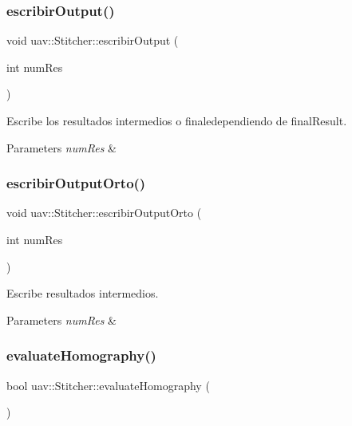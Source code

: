 \subsubsection{\texorpdfstring{escribir\+Output()}{escribirOutput()}}
{\footnotesize\ttfamily void uav\+::\+Stitcher\+::escribir\+Output (\begin{DoxyParamCaption}\item[{int}]{num\+Res }\end{DoxyParamCaption})\hspace{0.3cm}{\ttfamily [inline]}}



Escribe los resultados intermedios o finaledependiendo de final\+Result. 


\begin{DoxyParams}{Parameters}
{\em num\+Res} & \\
\hline
\end{DoxyParams}
\mbox{\label{classuav_1_1Stitcher_aa3ed2d63f08d787b3b78ec4445195b2b}} 
\subsubsection{\texorpdfstring{escribir\+Output\+Orto()}{escribirOutputOrto()}}
{\footnotesize\ttfamily void uav\+::\+Stitcher\+::escribir\+Output\+Orto (\begin{DoxyParamCaption}\item[{int}]{num\+Res }\end{DoxyParamCaption})\hspace{0.3cm}{\ttfamily [inline]}}



Escribe resultados intermedios. 


\begin{DoxyParams}{Parameters}
{\em num\+Res} & \\
\hline
\end{DoxyParams}
\mbox{\label{classuav_1_1Stitcher_a90039daf32275b9b9a4d7820e7a6a929}} 
\subsubsection{\texorpdfstring{evaluate\+Homography()}{evaluateHomography()}}
{\footnotesize\ttfamily bool uav\+::\+Stitcher\+::evaluate\+Homography (\begin{DoxyParamCaption}{ }\end{DoxyParamCaption})\hspace{0.3cm}{\ttfamily [inline]}}



